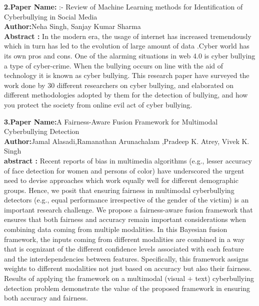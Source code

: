 \documentclass[oneside,a4paper,12pt]{report}
\begin{document}
\item \textbf{ 2.Paper Name:} :- Review of Machine Learning methods
for Identification of Cyberbullying in
Social Media\\
\textbf{Author:}Neha Singh, Sanjay Kumar Sharma\\
\textbf{Abstract :} In the modern era, the usage of internet has increased
tremendously which in turn has led to the evolution of large
amount of data .Cyber world has its own pros and cons. One of
the alarming situations in web 4.0 is cyber bullying a type of
cyber-crime. When the bullying occurs on line with the aid of
technology it is known as cyber bullying. This research paper
have surveyed the work done by 30 different researchers on
cyber bullying, and elaborated on different methodologies
adopted by them for the detection of bullying, and how you
protect the society from online evil act of cyber bullying.  \\ 
	
\newpage
	
\item \textbf{3.Paper Name:}A Fairness-Aware Fusion Framework for Multimodal Cyberbullying Detection  \\
\textbf{Author:}Jamal Alasadi,Ramanathan Arunachalam ,Pradeep K. Atrey, Vivek K. Singh \\
\textbf{abstract :} Recent reports of bias in multimedia algorithms
(e.g., lesser accuracy of face detection for women and persons of
color) have underscored the urgent need to devise approaches
which work equally well for different demographic groups.
Hence, we posit that ensuring fairness in multimodal cyberbullying
detectors (e.g., equal performance irrespective of the
gender of the victim) is an important research challenge. We
propose a fairness-aware fusion framework that ensures that
both fairness and accuracy remain important considerations
when combining data coming from multiple modalities. In
this Bayesian fusion framework, the inputs coming from
different modalities are combined in a way that is cognizant
of the different confidence levels associated with each feature
and the interdependencies between features. Specifically, this
framework assigns weights to different modalities not just
based on accuracy but also their fairness. Results of applying
the framework on a multimodal (visual + text) cyberbullying
detection problem demonstrate the value of the proposed
framework in ensuring both accuracy and fairness. %
\newpage
\end{document}
